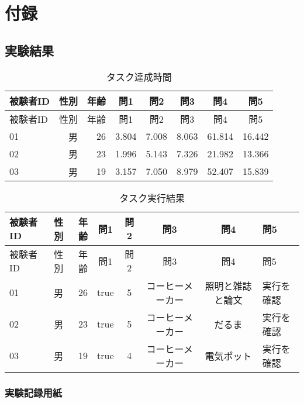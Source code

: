 \chapter{付録}\label{chap:appendix}

\section{実験結果}\label{ux5b9fux9a13ux7d50ux679c}

\begin{longtable}[c]{@{}lrrccccc@{}}
\caption{タスク達成時間}\tabularnewline
\toprule
被験者ID & 性別 & 年齢 & 問1 & 問2 & 問3 & 問4 & 問5\tabularnewline
\midrule
\endfirsthead
\toprule
被験者ID & 性別 & 年齢 & 問1 & 問2 & 問3 & 問4 & 問5\tabularnewline
\midrule
\endhead
01 & 男 & 26 & 3.804 & 7.008 & 8.063 & 61.814 & 16.442\tabularnewline
02 & 男 & 23 & 1.996 & 5.143 & 7.326 & 21.982 & 13.366\tabularnewline
03 & 男 & 19 & 3.157 & 7.050 & 8.979 & 52.407 & 15.839\tabularnewline
\bottomrule
\end{longtable}

\begin{longtable}[c]{@{}lrrccccl@{}}
\caption{タスク実行結果}\tabularnewline
\toprule
被験者ID & 性別 & 年齢 & 問1 & 問2 & 問3 & 問4 & 問5\tabularnewline
\midrule
\endfirsthead
\toprule
被験者ID & 性別 & 年齢 & 問1 & 問2 & 問3 & 問4 & 問5\tabularnewline
\midrule
\endhead
01 & 男 & 26 & true & 5 & コーヒーメーカー & 照明と雑誌と論文 &
実行を確認\tabularnewline
02 & 男 & 23 & true & 5 & コーヒーメーカー & だるま &
実行を確認\tabularnewline
03 & 男 & 19 & true & 4 & コーヒーメーカー & 電気ポット &
実行を確認\tabularnewline
\bottomrule
\end{longtable}

\subsection{実験記録用紙}\label{ux5b9fux9a13ux8a18ux9332ux7528ux7d19}
